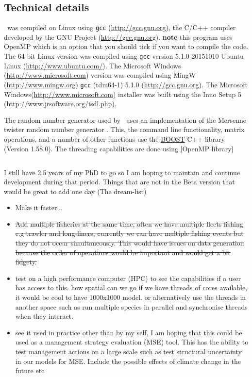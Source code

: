 \subsection{Technical details}\label{sec:tech}

\IBM\ was compiled on Linux using \texttt{gcc} (\url{http://gcc.gnu.org}), the C/C++ compiler developed by the GNU Project (\url{http://gcc.gnu.org}). \textbf{note} this program uses OpenMP which is an option that you should tick if you want to compile the code. The 64-bit Linux  version was compiled using \texttt{gcc} version 5.1.0 20151010 Ubuntu Linux (\url{http://www.ubuntu.com/}). The Microsoft Windows (\url{http://www.microsoft.com}) version was compiled using MingW (\url{http://www.mingw.org}) \texttt{gcc} (tdm64-1) 5.1.0 (\url{http://gcc.gnu.org}). The Microsoft Windows(\url{http://www.microsoft.com}) installer was built using the Inno Setup 5 (\url{http://www.jrsoftware.org/isdl.php}).

The random number generator used by \IBM\ uses an implementation of the Mersenne twister random number generator \citep{796}. This, the command line functionality, matrix operations, and a number of other functions use the \href{http://www.boost.org/}{BOOST} C++ library (Version 1.58.0). The threading capabilities are done using \href{https://www.openmp.org/}[OpenMP library]


\subsection{}
I still have 2.5 years of my PhD to go so I am hoping to maintain and continue development during that period. Things that are not in the Beta version that would be great to add one day (The dream-list)

\begin{itemize}
	\item Make it faster...
	\item \sout{Add multiple fisheries at the same time, often we have multiple fleets fishing e.g trawler and long-liners, currently we can have multiple fishing events but they do not occur simultaneously. This would have issues on data generation because the order of operations would be important and would get a bit fidgety.}
	\item test on a high performance computer (HPC) to see the capabilities if a user has access to this. how spatial can we go if we have threads of cores available, it would be cool to have 1000x1000 model. or alternatively use the threads in another space such as run multiple species in parallel and synchronise threads when they interact.	
	\item see it used in practice other than by my self, I am hoping that this could be used as a management strategy evaluation (MSE) tool. This has the ability to test management actions on a large scale such as test structural uncertainty in our models for MSE. Include the possible effects of climate change in the future etc
\end{itemize}



